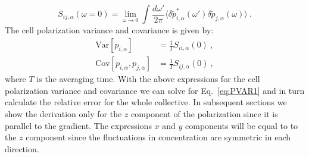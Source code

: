 \begin{equation} \label{eq:sij1}
    S_{ij,\alpha}(\omega=0) = \lim_{\omega \to 0} \int \frac{d\omega'}{2\pi}
    \langle \delta\tilde{p}_{i,\alpha}^*(\omega') \delta\tilde{p}_{j,\alpha}(\omega) \rangle \ .
\end{equation}
The cell polarization variance and covariance is given by:
\begin{align}
    \text{Var}[p_{i,\alpha}] &= \frac{1}{T} S_{ii,\alpha}(0) \ , \\
    \text{Cov}[p_{i,\alpha},p_{j,\alpha}] &= \frac{1}{T} S_{ij,\alpha}(0) \ ,
\end{align}
where $T$ is the averaging time.
With the above expressions for the cell polarization variance and covariance we can solve for Eq.\ \ref{eq:PVAR1} and in turn calculate the relative error for the whole collective. In subsequent sections we show the derivation only for the $z$ component of the polarization since it is parallel to the gradient. The expressions $x$ and $y$ components will be equal to to the $z$ component since the fluctuations in concentration are symmetric in each direction.



